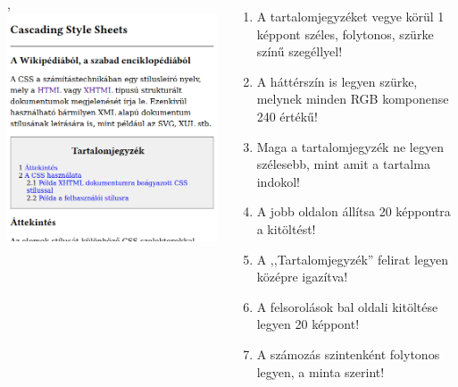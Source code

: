 \begin{frame}
  \begin{columns}[c]
      \begin{exampleblock}{, }
        \includegraphics[width=\textwidth]{css1.png}
      \end{exampleblock}
      \begin{enumerate}
        \setcounter{enumi}{\thefeladatSzamlalo}
        \item A tartalomjegyzéket vegye körül 1 képpont széles, folytonos, szürke színű szegéllyel!
        \item A háttérszín is legyen szürke, melynek minden RGB komponense 240 értékű!
        \item Maga a tartalomjegyzék ne legyen szélesebb, mint amit a tartalma indokol!
        \item A jobb oldalon állítsa 20 képpontra a kitöltést!
        \item A ,,Tartalomjegyzék'' felirat legyen középre igazítva!
        \item A felsorolások bal oldali kitöltése legyen 20 képpont!
        \item A számozás szintenként folytonos legyen, a minta szerint!
        \setcounter{feladatSzamlalo}{\theenumi}
      \end{enumerate}
  \end{columns}
\end{frame}

